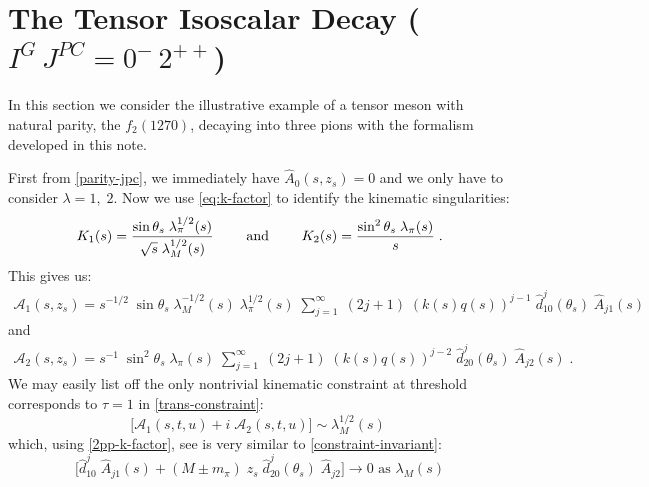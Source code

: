 \section{The Tensor Isoscalar Decay (\(I^G \,J^{PC} = 0^- \, 2^{++}\))} \label{app:2pp}
In this section we consider the illustrative example of a tensor meson with natural parity, the \(f_2(1270)\), decaying into three pions with the formalism developed in this note.

First from \cref{parity-jpc}, we immediately have \(\hat{A}_0(s,z_s) = 0\) and we only have to consider \(\lambda = 1, \; 2\). Now we use \cref{eq:k-factor} to identify the kinematic singularities:
  \begin{align}
    \label{2pp-k-factor}
  K_1(s) =  \frac{\sin\theta_s \;\lambda^{1/2}_\pi(s)}{ \sqrt{s} \; \lambda^{1/2}_M(s) }
  \qquad \text{ and } \qquad
  K_2(s) = \frac{\sin^2\theta_s \;\lambda_\pi(s)}{s} \; .
  \end{align}
This gives us:
  \begin{align}
    \label{eq:2pp-1}
    \mathcal{A}_1(s,z_s) = s^{-1/2} \; \sin\theta_s \; \lambda^{-1/2}_M(s)  \;\lambda^{1/2}_\pi(s)\; \sum_{j = 1}^\infty \; (2j+1) \; (k(s)q(s))^{j-1} \; \hat{d}_{10}^j(\theta_s) \; \hat{A}_{j1}(s)
  \end{align}
and
  \begin{align}
    \label{eq:2pp-2}
    \mathcal{A}_2(s,z_s) = s^{-1} \; \sin^2\theta_s \; \lambda_\pi(s) \; \sum_{j=1}^\infty \; (2j+1) \; (k(s)q(s))^{j-2} \; \hat{d}_{20}^j(\theta_s) \; \hat{A}_{j2}(s) \; .
  \end{align}
We may easily list off the only nontrivial kinematic constraint at threshold corresponds to \(\tau = 1\) in \cref{trans-constraint}:
  \begin{equation}
    \bigg[
    \mathcal{A}_{1}(s,t,u) + i \; \mathcal{A}_{2}(s,t,u)
    \bigg] \sim \lambda_M^{1/2}(s) \;
  \end{equation}
which, using \cref{2pp-k-factor}, see is very similar to \cref{constraint-invariant}:
  \begin{equation}
    \bigg[
    \hat{d}_{10}^j \; \hat{A}_{j1}(s) +  (M\pm m_\pi) \; z_s \; \hat{d}_{20}^j(\theta_s) \; \hat{A}_{j2}
    \bigg] \to 0 \text{ as } \lambda_M(s)
  \end{equation}
